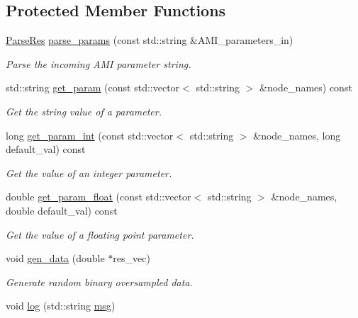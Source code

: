 \subsection*{Protected Member Functions}
\begin{DoxyCompactItemize}
\item 
\hyperlink{amimodel_8h_a5fbe8bcd249e7070ded2dadafa23ec1f}{Parse\+Res} \hyperlink{class_a_m_i_model_ad99c8cb946fe1d0b2197253130969368}{parse\+\_\+params} (const std\+::string \&A\+M\+I\+\_\+parameters\+\_\+in)
\begin{DoxyCompactList}\small\item\em Parse the incoming A\+M\+I parameter string. \end{DoxyCompactList}\item 
std\+::string \hyperlink{class_a_m_i_model_a62437e97ce61c76f4b9af78144385416}{get\+\_\+param} (const std\+::vector$<$ std\+::string $>$ \&node\+\_\+names) const 
\begin{DoxyCompactList}\small\item\em Get the string value of a parameter. \end{DoxyCompactList}\item 
long \hyperlink{class_a_m_i_model_a55b68d8a68be34f672d53968484225e1}{get\+\_\+param\+\_\+int} (const std\+::vector$<$ std\+::string $>$ \&node\+\_\+names, long default\+\_\+val) const 
\begin{DoxyCompactList}\small\item\em Get the value of an integer parameter. \end{DoxyCompactList}\item 
double \hyperlink{class_a_m_i_model_a2c2413b8658ec23c211cb993dc680fae}{get\+\_\+param\+\_\+float} (const std\+::vector$<$ std\+::string $>$ \&node\+\_\+names, double default\+\_\+val) const 
\begin{DoxyCompactList}\small\item\em Get the value of a floating point parameter. \end{DoxyCompactList}\item 
void \hyperlink{class_a_m_i_model_a1a12d71ed89870b9d6d07fc1370b3c85}{gen\+\_\+data} (double $\ast$res\+\_\+vec)
\begin{DoxyCompactList}\small\item\em Generate random binary oversampled data. \end{DoxyCompactList}\item 
void \hyperlink{class_a_m_i_model_a1e8cbd58a09b712dcf76a12f439bce30}{log} (std\+::string \hyperlink{class_a_m_i_model_ae65d47400fd3736682c229dab31392ad}{msg})
\end{DoxyCompactItemize}
